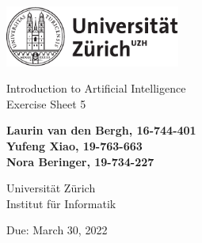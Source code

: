 \documentclass[12pt]{article}
\begin{document}
\begin{titlepage}
\includegraphics[height=20mm]{images/uzh_logo}\\

\begin{flushleft}

\vspace{2cm}

{\Large Introduction to Artificial Intelligence\\Exercise Sheet 5}\\

\vspace{4cm}

\textbf{Laurin van den Bergh, 16-744-401\\Yufeng Xiao, 19-763-663\\Nora Beringer, 19-734-227}\\

\vspace{2cm}

Universität Zürich\\
Institut für Informatik

\vfill Due: March 30, 2022

\vspace{3cm}


\end{flushleft}
\end{titlepage}

\newpage
\end{document}
